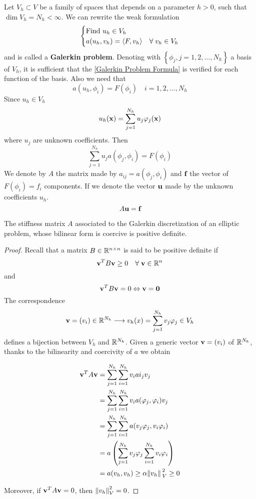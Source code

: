 Let \(V_h \subset V\) be a family of spaces that depends on a parameter \(h > 0\), such that \(\dim V_h = N_h < \infty\).
We can rewrite the weak formulation 
\begin{equation}
    \begin{cases}
        \text{Find } u_h \in V_h\\
        a(u_h,v_h) = \langle F,v_h \rangle & \forall \; v_h \in V_h \label{Galerkin Problem Formula}
    \end{cases}
\end{equation}
and is called a \textbf{Galerkin problem}. Denoting with \(\left\{\phi_j, j = 1,2,\ldots,N_h\right\}\) a basis of \(V_h\), it is sufficient that the \eqref{Galerkin Problem Formula} is verified for each function of the basis. 
Also we need that 
\[
    a(u_h, \phi_i) = F(\phi_i) \quad i = 1, 2, \ldots , N_h
\]
Since \(u_h \in V_h\)
\[
    u_h(\textbf{x})=\sum_{j=1}^{N_h} u_j \varphi_j(\textbf{x})
\]
where \(u_j\) are unknown coefficients. Then
\[
    \sum_{j=1}^{N_h}u_j a(\phi_j, \phi_i) = F(\phi_i)
\]
We denote by \(A\) the matrix made by \(a_{ij} = a(\phi_j, \phi_i)\) and \(\textbf{f}\) the vector of \(F(\phi_i) = f_i\) components. If we denote the vector \(\textbf{u}\) made by the unknown coefficients \(u_h\).
\begin{equation}
    A\textbf{u} = \textbf{f}
    \label{Linear system Galerkin}
\end{equation}
\begin{background}
    \begin{theorem}
    The stiffness matrix \(A\) associated to the Galerkin discretization of an elliptic problem, whose bilinear form is coercive is positive definite.
\end{theorem}
\begin{proof}
    Recall that a matrix \(B \in \mathbb{R}^{n\times n}\) is said to be positive definite if 
    \[
        \textbf{v}^TB\textbf{v} \geq 0 \quad \forall \; \textbf{v} \in \mathbb{R}^n
    \]
    and
    \[
        \textbf{v}^T B \textbf{v} = 0 \Leftrightarrow \textbf{v} = \textbf{0}
    \]
    The correspondence 
    \[
        \textbf{v} = (v_i) \in \mathbb{R}^{N_h} \longrightarrow v_h(x) = \sum_{j=1}^{N_h} v_j\varphi_j \in V_h
    \]
    defines a bijection between \(V_h\) and \(\mathbb{R}^{N_h}\). Given a generic vector \(\textbf{v} = (v_i)\) of \(\mathbb{R}^{N_h}\), thanks to the bilinearity and coercivity of \(a\) we obtain 
    
        \begin{align*}
        \textbf{v}^T A \textbf{v} & = \sum_{j=1}^{N_h}\sum_{i=1}^{N_h} v_i ai_j v_j \\
        & = \sum_{j=1}^{N_h}\sum_{i=1}^{N_h} v_ia(\varphi_j, \varphi_i)v_j\\
        & = \sum_{j=1}^{N_h}\sum_{i=1}^{N_h} a(v_j\varphi_j, v_i \varphi_i)\\
        & = a\left(\sum_{j=1}^{N_h}v_j\varphi_j\sum_{i=1}^{N_h}v_i\varphi_i\right)\\
        & = a(v_h,v_h) \geq \alpha \norm*{v_h}_V^2 \geq 0
        \end{align*}

    Moreover, if \(\textbf{v}^T A \textbf{v} = 0\), then \(\norm{v_h}_V^2 = 0\).
\end{proof}
\end{background}

